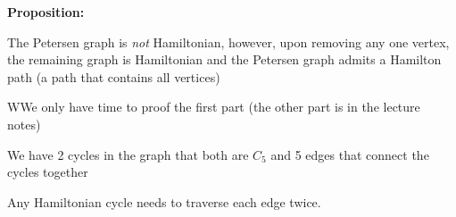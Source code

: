 \noindent\textbf{Proposition:}\par
\noindent The Petersen graph is \textit{not} Hamiltonian, however, upon removing any one vertex, the remaining graph is Hamiltonian and the Petersen graph admits a Hamilton path (a path that contains all vertices)
\par\bigskip
\begin{prf}
  WWe only have time to proof the first part (the other part is in the lecture notes)
  \par\bigskip
  \noindent We have 2 cycles in the graph that both are $C_5$  and 5 edges that connect the cycles together
  \par\bigskip
  \noindent Any Hamiltonian cycle needs to traverse each edge twice.  
\end{prf}
